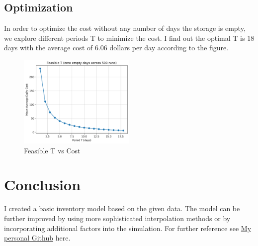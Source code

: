 \documentclass[11pt]{article}
\begin{document}
\subsection{Optimization}
In order to optimize the cost without any number of days the storage is empty, we explore different periods T to minimize the cost. I find out the optimal T is 18 days with the average cost of 6.06 dollars per day according to the figure.

\begin{figure}[H]
    \centering
    \includegraphics[width=0.5\textwidth]{feasible_T_vs_cost}
    \caption{Feasible T vs Cost}
    \label{feasible_T_vs_cost}
\end{figure}

\section{Conclusion}
I created a basic inventory model based on the given data. The model can be further improved by using more sophisticated interpolation methods or by incorporating additional factors into the simulation. For further reference see \href{https://github.com/yijiazho/data-analysis-hu/blob/main/inventory_model/model.py}{My personal Github} here.
\end{document}
